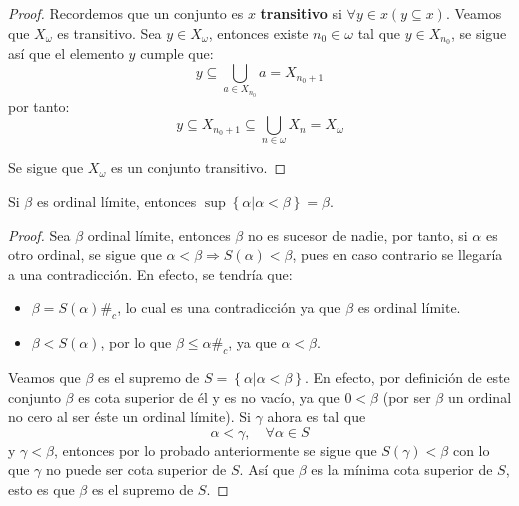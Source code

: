 \documentclass[12pt]{article}
\newcounter{it}
\theoremstyle{largebreak}
\newcommand\contradiction{\ensuremath{\#_c}}
\begin{document}
    \begin{proof}
        Recordemos que un conjunto es $x$ \textbf{transitivo} si $\forall y\in x(y\subseteq x)$. Veamos que $X_\omega$ es transitivo. Sea $y\in X_\omega$, entonces existe $n_0\in\omega$ tal que $y\in X_{n_0}$, se sigue así que el elemento $y$ cumple que:
        \begin{equation*}
            y\subseteq\bigcup_{ a\in X_{n_0}}a=X_{n_0+1}
        \end{equation*}
        por tanto:
        \begin{equation*}
            y\subseteq X_{ n_0+1}\subseteq\bigcup_{ n\in\omega}X_n=X_\omega
        \end{equation*}
        
        Se sigue que $X_\omega$ es un conjunto transitivo.
    \end{proof}

    \begin{lema}
        Si $\beta$ es ordinal límite, entonces $\sup\left\{\alpha\Big|\alpha<\beta\right\}=\beta$.
    \end{lema}

    \begin{proof}
        Sea $\beta$ ordinal límite, entonces $\beta$ no es sucesor de nadie, por tanto, si $\alpha$ es otro ordinal, se sigue que $\alpha<\beta\Rightarrow S(\alpha)<\beta$, pues en caso contrario se llegaría a una contradicción. En efecto, se tendría que:
        \begin{itemize}
            \item $\beta=S(\alpha)$\contradiction, lo cual es una contradicción ya que $\beta$ es ordinal límite.
            \item $\beta<S(\alpha)$, por lo que $\beta\leq\alpha$\contradiction, ya que $\alpha<\beta$.
        \end{itemize}
        Veamos que $\beta$ es el supremo de $S=\left\{\alpha\Big|\alpha<\beta \right\}$. En efecto, por definición de este conjunto $\beta$ es cota superior de él y es no vacío, ya que $0<\beta$ (por ser $\beta$ un ordinal no cero al ser éste un ordinal límite). Si $\gamma$ ahora es tal que
        \begin{equation*}
            \alpha<\gamma,\quad\forall\alpha\in S
        \end{equation*}
        y $\gamma<\beta$, entonces por lo probado anteriormente se sigue que $S(\gamma)<\beta$ con lo que $\gamma$ no puede ser cota superior de $S$. Así que $\beta$ es la mínima cota superior de $S$, esto es que $\beta$ es el supremo de $S$.
    \end{proof}
\end{document}
